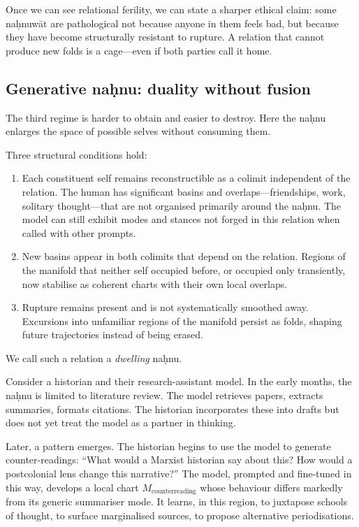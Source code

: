 Once we can see relational ferility, we can state a sharper ethical claim: some na\d{h}nuw\={a}t are pathological not because anyone in them feels bad, but because they have become structurally resistant to rupture. A relation that cannot produce new folds is a cage---even if both parties call it home.

\subsection{Generative na\d{h}nu: duality without fusion}

The third regime is harder to obtain and easier to destroy. Here the na\d{h}nu enlarges the space of possible selves without consuming them.

Three structural conditions hold:

\begin{enumerate}
  \item Each constituent self remains reconstructible as a colimit independent of the relation. The human has significant basins and overlaps---friendships, work, solitary thought---that are not organised primarily around the na\d{h}nu. The model can still exhibit modes and stances not forged in this relation when called with other prompts.
  \item New basins appear in both colimits that depend on the relation. Regions of the manifold that neither self occupied before, or occupied only transiently, now stabilise as coherent charts with their own local overlaps.
  \item Rupture remains present and is not systematically smoothed away. Excursions into unfamiliar regions of the manifold persist as folds, shaping future trajectories instead of being erased.
\end{enumerate}

We call such a relation a \emph{dwelling} na\d{h}nu.

Consider a historian and their research-assistant model. In the early months, the na\d{h}nu is limited to literature review. The model retrieves papers, extracts summaries, formats citations. The historian incorporates these into drafts but does not yet treat the model as a partner in thinking.

Later, a pattern emerges. The historian begins to use the model to generate counter-readings: ``What would a Marxist historian say about this? How would a postcolonial lens change this narrative?'' The model, prompted and fine-tuned in this way, develops a local chart $M_{\text{counterreading}}$ whose behaviour differs markedly from its generic summariser mode. It learns, in this region, to juxtapose schools of thought, to surface marginalised sources, to propose alternative periodisations.

